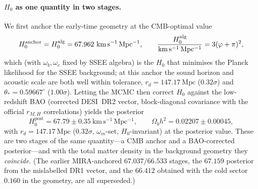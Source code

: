 \documentclass[aps,prd,preprint,amsmath,amssymb,nofootinbib,longbibliography]{revtex4-2}
\newcommand{\kms}{\mathrm{km\,s^{-1}\,Mpc^{-1}}}
\begin{document}
\paragraph{$H_0$ as one quantity in two stages.} We first anchor the
early-time geometry at the CMB-optimal value
\begin{equation}
  H_0^{\mathrm{anchor}} = H_0^{\rm alg} = 67.962~\kms ,
  \qquad
  \frac{H_0^{\rm alg}}{\kms} = 3(\varphi+\pi)^2 ,
  \label{eq:h0anchor}
\end{equation}
which (with $\omega_b,\omega_c$ fixed by SSEE algebra) is the $H_0$ that
minimises the Planck likelihood for the SSEE background; at this anchor the
sound horizon and acoustic scale are both well within tolerance,
$r_d = 147.17~\mathrm{Mpc}$ ($0.32\sigma$) and
$\theta_\ast = 0.59667^\circ$ ($1.00\sigma$). Letting the MCMC then correct
$H_0$ against the low-redshift BAO (corrected DESI~DR2 vector, block-diagonal
covariance with the official $r_{M,H}$ correlations) yields the posterior
\begin{equation}
  H_0^{\mathrm{post}} = 67.79 \pm 0.35~\kms ,
  \qquad
  \Omega_b h^2 = 0.02207 \pm 0.00045 ,
  \label{eq:h0post}
\end{equation}
with $r_d = 147.17~\mathrm{Mpc}$ ($0.32\sigma$, $\omega_m$-set, $H_0$-invariant)
at the posterior value. These are two stages of the same quantity---a CMB
anchor and a BAO-corrected posterior---and with the total matter density in the
background geometry they \emph{coincide}. (The earlier MIRA-anchored
$67.037/66.533$ stages, the $67.159$ posterior from the mislabelled DR1 vector,
and the $66.412$ obtained with the cold sector $0.160$ in the geometry, are all
superseded.)
\end{document}
